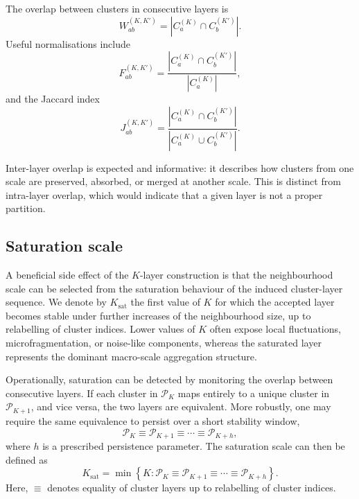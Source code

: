 \documentclass[pdflatex,sn-mathphys-num]{sn-jnl}
\newcommand{\calP}{\mathcal{P}}
\begin{document}
The overlap between clusters in consecutive layers is
\begin{equation}
W_{ab}^{(K,K')}=|C_a^{(K)}\cap C_b^{(K')}|.
\label{eq:overlap_count}
\end{equation}
Useful normalisations include
\begin{equation}
F_{ab}^{(K,K')}=\frac{|C_a^{(K)}\cap C_b^{(K')}|}{|C_a^{(K)}|},
\label{eq:frac_from}
\end{equation}
and the Jaccard index
\begin{equation}
J_{ab}^{(K,K')}=\frac{|C_a^{(K)}\cap C_b^{(K')}|}{|C_a^{(K)}\cup C_b^{(K')}|}.
\label{eq:jaccard}
\end{equation}

Inter-layer overlap is expected and informative: it describes how clusters from one scale are preserved, absorbed, or merged at another scale. This is distinct from intra-layer overlap, which would indicate that a given layer is not a proper partition.

\subsection{Saturation scale}

A beneficial side effect of the $K$-layer construction is that the neighbourhood scale can be selected from the saturation behaviour of the induced cluster-layer sequence. We denote by $K_{\mathrm{sat}}$ the first value of $K$ for which the accepted layer becomes stable under further increases of the neighbourhood size, up to relabelling of cluster indices. Lower values of $K$ often expose local fluctuations, microfragmentation, or noise-like components, whereas the saturated layer represents the dominant macro-scale aggregation structure.

Operationally, saturation can be detected by monitoring the overlap between consecutive layers. If each cluster in $\calP_K$ maps entirely to a unique cluster in $\calP_{K+1}$, and vice versa, the two layers are equivalent. More robustly, one may require the same equivalence to persist over a short stability window,
\begin{equation}
\calP_K \equiv \calP_{K+1}\equiv\cdots\equiv\calP_{K+h},
\label{eq:partition_stability_window}
\end{equation}
where $h$ is a prescribed persistence parameter. The saturation scale can then be defined as
\begin{equation}
K_{\mathrm{sat}}=
\min\left\{
K:\calP_K \equiv \calP_{K+1}\equiv\cdots\equiv\calP_{K+h}
\right\}.
\label{eq:ksat}
\end{equation}
Here, $\equiv$ denotes equality of cluster layers up to relabelling of cluster indices.
\end{document}
